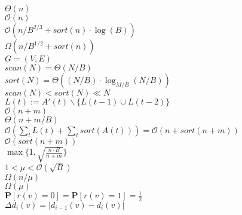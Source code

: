 \documentclass[12pt,a4paper,titlepage,xcolor=dvipsnames]{article}
\begin{document}
\noindent
$\Theta(n)$\\
$\mathcal{O}(n)$\\
$\mathcal{O}(n/B^{2/3}+sort(n)\cdot \log (B))$\\
$\Omega(n/B^{1/2}+sort(n))$\\
$G=(V,E)$\\
$scan(N)=\Theta(N/B)$\\
$sort(N)=\Theta((N/B)\cdot \log_{M/B}(N/B))$\\
$scan(N)<sort(N)\ll N$\\
$L(t):=A'(t)\backslash \{L(t-1)\cup L(t-2)\}$\\
$\mathcal{O}(n+m)$\\
$\Theta(n+m/B)$\\
$\mathcal{O}(\sum_t L(t)+\sum_t sort(A(t)))=\mathcal{O}(n+sort(n+m))$\\
$\mathcal{O}(sort(n+m))$\\
$\max\{1,\sqrt{\frac{n\cdot B}{n+m}}\}$\\
$1<\mu < \mathcal{O}(\sqrt{B})$\\
$\Omega(n/\mu)$\\
$\Omega(\mu)$\\
$\textbf{P}[r(v)=0]=\textbf{P}[r(v)=1]=\frac{1}{2}$\\
$\Delta d_i(v)=|d_{i-1}(v)-d_i(v)|$\\



\label{End}
\end{document}
